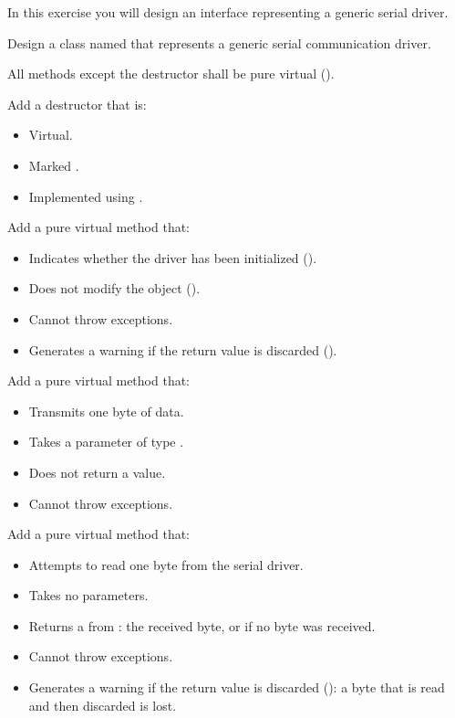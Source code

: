 \label{c4:set:1}

\label{c4:ex:1.1}
In this exercise you will design an interface  representing a
generic serial driver.

Design a class named  that represents a generic serial
communication driver.

All methods except the destructor shall be pure virtual ().

Add a destructor that is:
\begin{itemize}
  \item Virtual.
  \item Marked .
  \item Implemented using .
\end{itemize}

Add a pure virtual method  that:
\begin{itemize}
  \item Indicates whether the driver has been initialized ().
  \item Does not modify the object ().
  \item Cannot throw exceptions.
  \item Generates a warning if the return value is discarded (\code{[[nodiscard]]}).
\end{itemize}

Add a pure virtual method  that:
\begin{itemize}
  \item Transmits one byte of data.
  \item Takes a parameter of type .
  \item Does not return a value.
  \item Cannot throw exceptions.
\end{itemize}

Add a pure virtual method  that:
\begin{itemize}
  \item Attempts to read one byte from the serial driver.
  \item Takes no parameters.
  \item Returns a  from : the received byte, or
     if no byte was received.
  \item Cannot throw exceptions.
  \item Generates a warning if the return value is discarded (\code{[[nodiscard]]}): a byte that is
    read and then discarded is lost.
\end{itemize}


